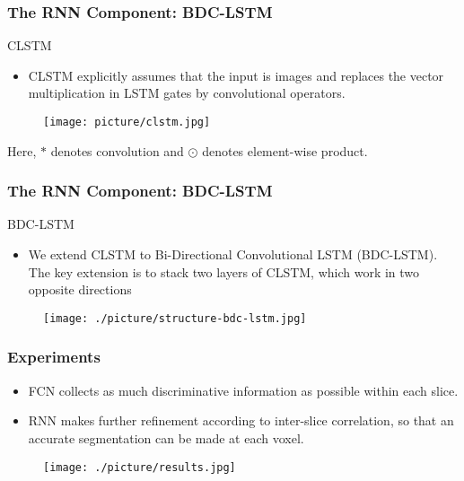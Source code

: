 \documentclass{beamer}
\begin{document}
\begin{frame}
  \frametitle{The RNN Component: BDC-LSTM}
  CLSTM
  \begin{itemize}
  \item CLSTM explicitly assumes that the input is images and replaces the vector
    multiplication in LSTM gates by convolutional operators.
  \end{itemize}
  \begin{figure}[!htb]
    \centering
    \texttt{[image: picture/clstm.jpg]}
  \end{figure}
  Here, $*$ denotes convolution and $\odot$ denotes element-wise product.
\end{frame}

\begin{frame}
  \frametitle{The RNN Component: BDC-LSTM}
  BDC-LSTM
  \begin{itemize}
  \item We extend CLSTM to Bi-Directional Convolutional LSTM (BDC-LSTM). The key extension
    is to stack two layers of CLSTM, which work in two opposite directions 
  \end{itemize}
  \begin{figure}[!htb]
    \centering
    \texttt{[image: ./picture/structure-bdc-lstm.jpg]}
  \end{figure}

\end{frame}

\begin{frame}
  \frametitle{Experiments}
  \begin{itemize}
  \item FCN collects as much discriminative information as possible within each slice.
  \item RNN makes further refinement according to inter-slice correlation, so that an accurate
    segmentation can be made at each voxel.
  \end{itemize}
  \begin{figure}[!htb]
    \centering
    \texttt{[image: ./picture/results.jpg]}
  \end{figure}
\end{frame}



\end{document}
